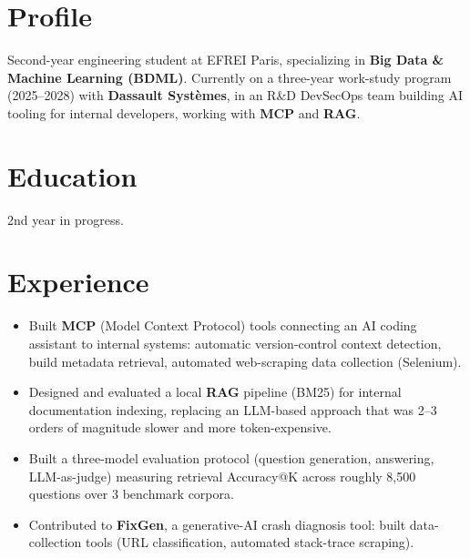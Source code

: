 \documentclass[9.5pt]{article}
\begin{document}
\noindent
\begin{minipage}[t]{0.645\textwidth}

\section*{\large\bfseries\color{accent}Profile}
\vspace{-2pt}
\noindent\small
Second-year engineering student at EFREI Paris, specializing in \textbf{Big Data \& Machine Learning (BDML)}. Currently on a three-year work-study program (2025--2028) with \textbf{Dassault Systèmes}, in an R\&D DevSecOps team building AI tooling for internal developers, working with \textbf{MCP} and \textbf{RAG}.

\section*{\large\bfseries\color{accent}Education}
\vspace{-2pt}
{\small 2nd year in progress.}

\vspace{2pt}

\vspace{2pt}

\section*{\large\bfseries\color{accent}Experience}
\vspace{-2pt}
\begin{itemize}\small
  \item Built \textbf{MCP} (Model Context Protocol) tools connecting an AI coding assistant to internal systems: automatic version-control context detection, build metadata retrieval, automated web-scraping data collection (Selenium).
  \item Designed and evaluated a local \textbf{RAG} pipeline (BM25) for internal documentation indexing, replacing an LLM-based approach that was 2--3 orders of magnitude slower and more token-expensive.
  \item Built a three-model evaluation protocol (question generation, answering, LLM-as-judge) measuring retrieval Accuracy@K across roughly 8,500 questions over 3 benchmark corpora.
  \item Contributed to \textbf{FixGen}, a generative-AI crash diagnosis tool: built data-collection tools (URL classification, automated stack-trace scraping).
\end{itemize}


\end{minipage}
\end{document}
